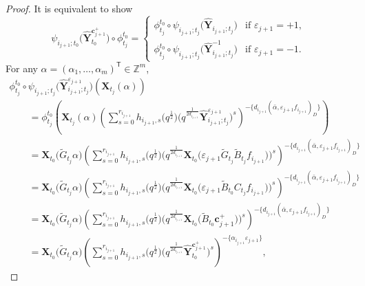 \begin{proof}
It is equivalent to show
 \[
 \psi_{i_{j+1};t_{0}}\bigl(\mathbf{\hat{Y}}_{t_{0}}^{\mathbf{c}_{j+1}^{+}}\bigr)\circ\phi_{t_{j}}^{t_{0}}=\begin{cases}
 \phi_{t_{j}}^{t_{0}}\circ\psi_{i_{j+1};t_{j}}\bigl(\mathbf{\hat{Y}}_{i_{j+1};t_{j}}\bigr) & \text{if $\varepsilon_{j+1}=+1$},\\
 \phi_{t_{j}}^{t_{0}}\circ\psi_{i_{j+1};t_{j}}\bigl(\mathbf{\hat{Y}}^{-1}_{i_{j+1};t_{j}}\bigr) & \text{if $\varepsilon_{j+1}=-1$.}
 \end{cases}
 \]
 For any $\alpha=(\alpha_{1},\dots,\alpha_{m})^{\mathsf T}\in\mathbb{Z}^{m}$,
 \begin{gather*}
  \phi_{t_{j}}^{t_{0}}\circ\psi_{i_{j+1};t_{j}}\bigl(\mathbf{\hat{Y}}_{i_{j+1};t_{j}}^{\varepsilon_{j+1}}\bigr)(\mathbf{X}_{t_{j}}(\alpha))\\
  \qquad=\phi_{t_{j}}^{t_{0}}\left(\mathbf{X}_{t_{j}}(\alpha)\left(\sum\limits_{s=0}^{r_{i_{j+1}}} h_{i_{j+1},s}\bigl(q^{\frac{1}{2}}\bigr)\bigl(q^{\frac{1}{2d_{i_{j+1}}}}\mathbf{\hat{Y}}_{i_{j+1};t_{j}}^{\varepsilon_{j+1}}\bigr)^{s}\right)^{-\{d_{i_{j+1}}(\bar{\alpha},\varepsilon_{j+1}f_{i_{j+1}})_D\}}\right)\\
 \qquad =\mathbf{X}_{t_{0}}\bigl(\tilde{G}_{t_{j}}\alpha\bigr)\left(\sum\limits_{s=0}^{r_{i_{j+1}}} h_{i_{j+1},s}\bigl(q^{\frac{1}{2}}\bigr)\bigl(q^{\frac{1}{2d_{i_{j+1}}}}\mathbf{X}_{t_0}\bigl(\varepsilon_{j+1}\tilde{G}_{t_{j}}\tilde{B}_{t_{j}}f_{i_{j+1}}\bigr)\bigr)^{s}\right)^{-\{d_{i_{j+1}}(\bar{\alpha},\varepsilon_{j+1}f_{i_{j+1}})_D\}}\\
 \qquad =\mathbf{X}_{t_{0}}\bigl(\tilde{G}_{t_{j}}\alpha\bigr)\left(\sum\limits_{s=0}^{r_{i_{j+1}}} h_{i_{j+1},s}\bigl(q^{\frac{1}{2}}\bigr)\bigl(q^{\frac{1}{2d_{i_{j+1}}}}\mathbf{X}_{t_0}\bigl(\varepsilon_{j+1}\tilde{B}_{t_{0}}C_{t_{j}}f_{i_{j+1}}\bigr)\bigr)^{s}\right)^{-\{d_{i_{j+1}}(\bar{\alpha},\varepsilon_{j+1}f_{i_{j+1}})_D\}}\\
 \qquad =\mathbf{X}_{t_{0}}\bigl(\tilde{G}_{t_{j}}\alpha\bigr)\left(\sum\limits_{s=0}^{r_{i_{j+1}}} h_{i_{j+1},s}\bigl(q^{\frac{1}{2}}\bigr)\bigl(q^{\frac{1}{2d_{i_{j+1}}}}\mathbf{X}_{t_0}\bigl(\tilde{B}_{t_{0}}\mathbf{c}_{j+1}^{+}\bigr)\bigr)^{s}\right)^{-\{d_{i_{j+1}}(\bar{\alpha},\varepsilon_{j+1}f_{i_{j+1}})_D\}}\\
 \qquad =\mathbf{X}_{t_{0}}\bigl(\tilde{G}_{t_{j}}\alpha\bigr)\left(\sum\limits_{s=0}^{r_{i_{j+1}}} h_{i_{j+1},s}\bigl(q^{\frac{1}{2}}\bigr)\bigl(q^{\frac{1}{2d_{i_{j+1}}}}\mathbf{\hat{Y}}_{t_{0}}^{\mathbf{c}_{j+1}^{+}}\bigr)^{s}\right)^{-\{\alpha_{i_{j+1}}\varepsilon_{j+1}\}},

\end{gather*}
\end{proof}
